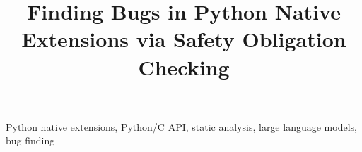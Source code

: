 \documentclass[10pt,conference]{IEEEtran}
\title{Finding Bugs in Python Native Extensions via Safety Obligation Checking}
\author{}
\begin{document}
\maketitle

\begin{abstract}
\paperabstract
\end{abstract}

\begin{IEEEkeywords}
Python native extensions, Python/C API, static analysis, large language models, bug finding
\end{IEEEkeywords}










\IEEEtriggercmd{\relax}


\end{document}
